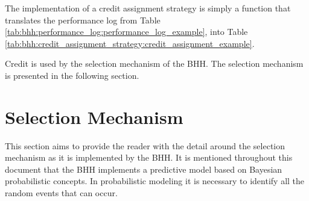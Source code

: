 The implementation of a credit assignment strategy is simply a function that translates the performance log from Table \ref{tab:bhh:performance_log:performance_log_example}, into Table \ref{tab:bhh:credit_assignment_strategy:credit_assignment_example}.

\begin{table}[htbp]
      \centering
      \caption{Credit assignment strategy output table showing \textit{ibest} credit assignment for the first 5 entities and their selected heuristics, for step 1 of the training process.}
      \label{tab:bhh:credit_assignment_strategy:credit_assignment_example}%
      \par\bigskip
\end{table}%

Credit is used by the selection mechanism of the \acs{BHH}. The selection mechanism is presented in the following section.


\section{Selection Mechanism}\label{sec:bhh:selection_mechanism}

This section aims to provide the reader with the detail around the selection mechanism as it is implemented by the \acs{BHH}. It is mentioned throughout this document that the \acs{BHH} implements a predictive model based on Bayesian probabilistic concepts. In probabilistic modeling it is necessary to identify all the random events that can occur.

